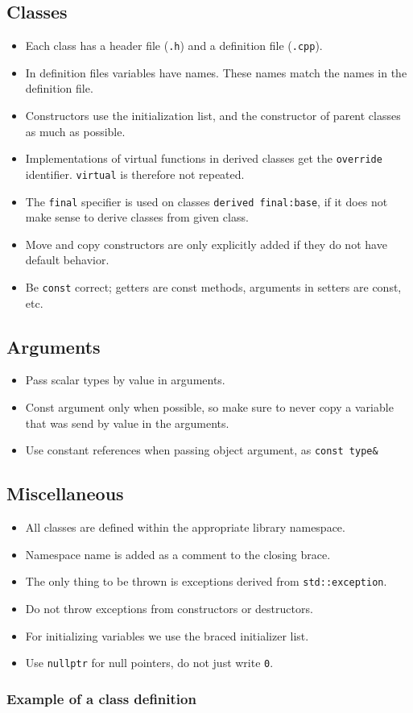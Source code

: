 \documentclass{article}
\begin{document}
\subsection{Classes}
\begin{itemize}
 \item Each class has a header file (\verb|.h|) and a definition file (\verb|.cpp|).
 \item In definition files variables have names. These names match the names in the definition file.
 \item Constructors use the initialization list, and the constructor of parent classes as much as possible.
 \item Implementations of virtual functions in derived classes get the \verb|override| identifier. \verb|virtual| is therefore not repeated.
 \item The \verb|final| specifier is used on classes \verb|derived final:base|, if it does not make sense to derive classes from given class.
 \item Move and copy constructors are only explicitly added if they do not have default behavior.
 \item Be \verb|const| correct; getters are const methods, arguments in setters are const, etc.
\end{itemize}

\subsection{Arguments}
\begin{itemize}
 \item Pass scalar types by value in arguments. 
 \item Const argument only when possible, so make sure to never copy a variable that was send by value in the arguments.
 \item Use constant references when passing object argument, as \verb|const type&|
\end{itemize}

\subsection{Miscellaneous}

\begin{itemize}
 \item All classes are defined within the appropriate library namespace.
 \item Namespace name is added as a comment to the closing brace.
 \item The only thing to be thrown is exceptions derived from \verb|std::exception|.
 \item Do not throw exceptions from constructors or destructors.
 \item For initializing variables we use the braced initializer list.
 \item Use \verb|nullptr| for null pointers, do not just write \verb|0|.
\end{itemize}

\subsubsection{Example of a class definition}


\end{document}
